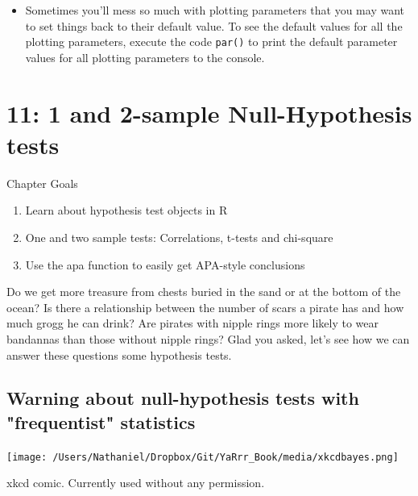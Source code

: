 \documentclass{tufte-book}\usepackage[]{graphicx}\usepackage[]{color}
\begin{document}
\begin{itemize}
\item Sometimes you'll mess so much with plotting parameters that you may want to set things back to their default value. To see the default values for all the plotting parameters, execute the code \texttt{par()} to print the default parameter values for all plotting parameters to the console.



\end{itemize}



\chapter{11: 1 and 2-sample Null-Hypothesis tests}
\label{ch:11}


Chapter Goals

\begin{enumerate}
  \item Learn about hypothesis test objects in R
  \item One and two sample tests: Correlations, t-tests and chi-square
  \item Use the apa function to easily get APA-style conclusions
\end{enumerate}

Do we get more treasure from chests buried in the sand or at the bottom of the ocean? Is there a relationship between the number of scars a pirate has and how much grogg he can drink? Are pirates with nipple rings more likely to wear bandannas than those without nipple rings? Glad you asked, let's see how we can answer these questions some hypothesis tests.

\section{Warning about null-hypothesis tests with "frequentist" statistics}

\begin{marginfigure}
\texttt{[image: /Users/Nathaniel/Dropbox/Git/YaRrr\_Book/media/xkcdbayes.png]}
\caption{xkcd comic. Currently used without any permission.}
\label{fig:xkcdbayes}
\end{marginfigure}
\end{document}
